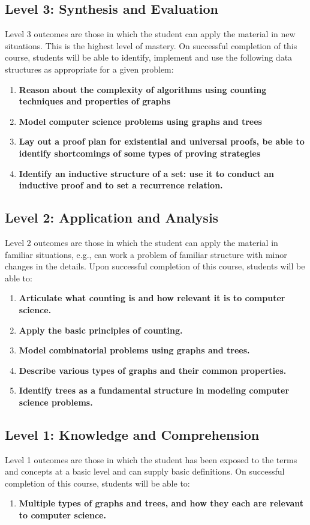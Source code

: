 \documentclass[12pt]{scrartcl}
\begin{document}
\subsection*{Level 3: Synthesis and Evaluation}
Level 3 outcomes are those in which the student can apply the material in new situations. This is the highest level of mastery. On successful completion of this course, students will be able to identify, implement and use the following data structures as appropriate for a given problem:
\begin{enumerate}
\item \textbf{Reason about the complexity of algorithms using counting techniques and properties of graphs}
\item \textbf{Model computer science problems using graphs and trees}
\item \textbf{Lay out a proof plan for existential and universal proofs, be able to identify shortcomings of some types of
proving strategies}
\item \textbf{Identify an inductive structure of a set: use it to conduct an inductive proof and to set a recurrence relation.}
\end{enumerate}

\subsection*{Level 2: Application and Analysis}
Level 2 outcomes are those in which the student can apply the material in familiar situations, e.g., can work a problem of familiar structure with minor changes in the details. Upon successful completion of this course, students will be able to:
\begin{enumerate}
\item \textbf{Articulate what counting is and how relevant it is to computer science.}
\item \textbf{Apply the basic principles of counting.}
\item \textbf{Model combinatorial problems using graphs and trees.}
\item \textbf{Describe various types of graphs and their common properties.}
\item \textbf{Identify trees as a fundamental structure in modeling computer science problems.}
\end{enumerate}

\subsection*{Level 1: Knowledge and Comprehension}
Level 1 outcomes are those in which the student has been exposed to the terms and concepts at a basic level and can supply basic definitions. On successful completion of this course, students will be able to:
\begin{enumerate}
\item \textbf{Multiple types of graphs and trees, and how they each are relevant to computer science.}
\end{enumerate}


\end{document}
